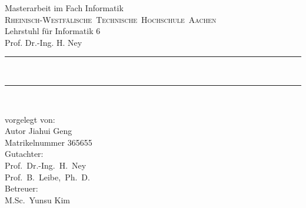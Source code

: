 
\date{\publicationDate}
\thispagestyle{empty}
\begin{titlepage}
  \begin{minipage}[h]{14.5cm}
  \parindent=0pt
  \raggedleft
 
\vspace{0.4cm}

  \Large
  Masterarbeit im Fach Informatik\\
  \textsc{Rheinisch-Westf\"alische~Technische~Hochschule~Aachen}\\
  Lehrstuhl f\"ur Informatik 6\\
  Prof. Dr.-Ing. H. Ney\\%
  \vspace{0.4cm}
  \rule{\textwidth}{1mm}
  \makeatletter \Huge \center
  \textbf{\@title}\\
  \rule{\textwidth}{1mm}
  \raggedleft
  \vspace{2cm}
  \Large

  \@date\\
  \vspace{0.4cm}

  vorgelegt von:
  \\ Autor Jiahui Geng
  \\ Matrikelnummer 365655
  \\[2eX]
  Gutachter:\\
  Prof.~Dr.-Ing.~H.~Ney\\
  Prof.~B.~Leibe,~Ph.~D.\\[2eX]
  Betreuer:\\
  M.Sc.\ Yunsu Kim
  \makeatother
  \vfill\vfill
  \end{minipage}
\end{titlepage}
